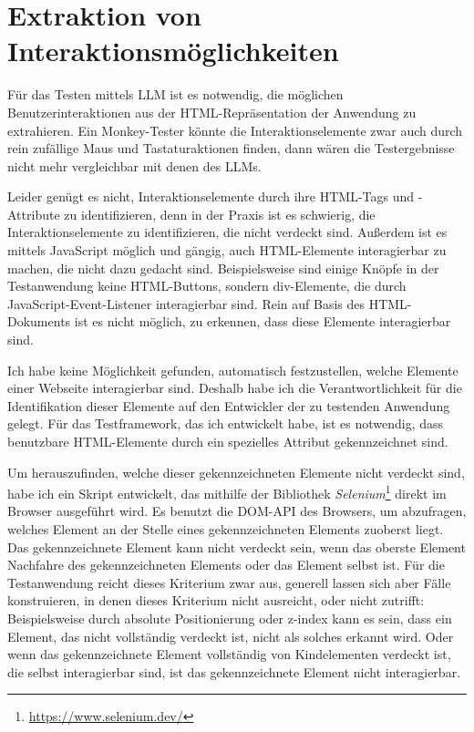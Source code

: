 \section{Extraktion von Interaktionsmöglichkeiten}

Für das Testen mittels LLM ist es notwendig, die möglichen Benutzerinteraktionen aus der HTML-Repräsentation der Anwendung zu extrahieren.
Ein Monkey-Tester könnte die Interaktionselemente zwar auch durch rein zufällige Maus und Tastaturaktionen finden, dann wären die Testergebnisse nicht mehr vergleichbar mit denen des LLMs.

Leider genügt es nicht, Interaktionselemente durch ihre HTML-Tags und -Attribute zu identifizieren, denn in der Praxis ist es schwierig, die Interaktionselemente zu identifizieren, die nicht verdeckt sind.
Außerdem ist es mittels JavaScript möglich und gängig, auch HTML-Elemente interagierbar zu machen, die nicht dazu gedacht sind.
Beispielsweise sind einige Knöpfe in der Testanwendung keine HTML-Buttons, sondern div-Elemente, die durch JavaScript-Event-Listener interagierbar sind.
Rein auf Basis des HTML-Dokuments ist es nicht möglich, zu erkennen, dass diese Elemente interagierbar sind.

Ich habe keine Möglichkeit gefunden, automatisch festzustellen, welche Elemente einer Webseite interagierbar sind.
Deshalb habe ich die Verantwortlichkeit für die Identifikation dieser Elemente auf den Entwickler der zu testenden Anwendung gelegt.
Für das Testframework, das ich entwickelt habe, ist es notwendig, dass benutzbare HTML-Elemente durch ein spezielles Attribut gekennzeichnet sind.

Um herauszufinden, welche dieser gekennzeichneten Elemente nicht verdeckt sind, habe ich ein Skript entwickelt, das mithilfe der Bibliothek \textit{Selenium}\footnote{\url{https://www.selenium.dev/}} direkt im Browser ausgeführt wird.
Es benutzt die DOM-API des Browsers, um abzufragen, welches Element an der Stelle eines gekennzeichneten Elements zuoberst liegt.
Das gekennzeichnete Element kann nicht verdeckt sein, wenn das oberste Element Nachfahre des gekennzeichneten Elements oder das Element selbst ist.
Für die Testanwendung reicht dieses Kriterium zwar aus, generell lassen sich aber Fälle konstruieren, in denen dieses Kriterium nicht ausreicht, oder nicht zutrifft:
Beispielsweise durch absolute Positionierung oder z-index kann es sein, dass ein Element, das nicht vollständig verdeckt ist, nicht als solches erkannt wird.
Oder wenn das gekennzeichnete Element vollständig von Kindelementen verdeckt ist, die selbst interagierbar sind, ist das gekennzeichnete Element nicht interagierbar.

